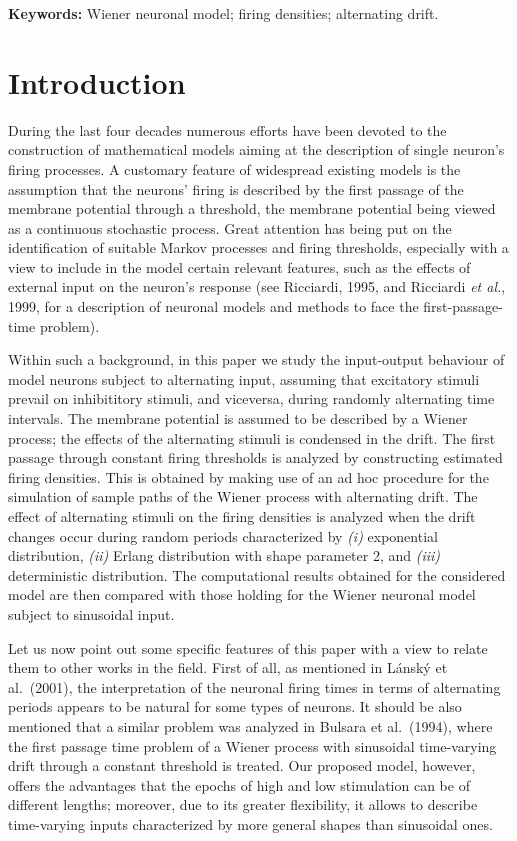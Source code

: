 \medskip\noindent
{\bf Keywords:} Wiener neuronal model; firing densities;
alternating drift.

\section{Introduction}\label{section:1}
During the last four decades numerous efforts have been devoted to the construction of mathematical
models aiming at the description of single neuron's firing processes. A customary feature of
widespread existing models is the assumption that the neurons' firing is described by the first
passage of the membrane potential through a threshold, the membrane potential being
viewed as a continuous stochastic process. Great attention has being put on the identification of
suitable Markov processes and firing thresholds, especially with a view to include in the model
certain relevant features, such as the effects of external input on the neuron's response
(see Ricciardi, 1995, and Ricciardi {\em et al.}, 1999, for a description of neuronal models
and methods to face the first-passage-time problem).
\par
Within such a background, in this paper we study the input-output behaviour of model neurons 
subject to alternating input, assuming that excitatory stimuli prevail on inhibititory 
stimuli, and viceversa, during randomly alternating time intervals. The membrane potential 
is assumed to be described by a Wiener process; the effects of the alternating stimuli is 
condensed in the drift. The first passage through constant firing thresholds is analyzed
by constructing estimated firing densities. This is obtained by making use of an ad hoc
procedure for the simulation of sample paths of the Wiener process with alternating drift.
The effect of alternating stimuli on the firing densities is
analyzed when the drift changes occur during random periods characterized by 
{\em (i)\/} exponential distribution, {\em (ii)\/} Erlang distribution with 
shape parameter 2, and {\em (iii)\/} deterministic distribution.
The computational results obtained for the considered model are then compared with
those holding for the Wiener neuronal model subject to sinusoidal input.
\par
Let us now point out some specific features of this paper with a view to relate them 
to other works in the field. First of all, as mentioned in L\'ansk\'y et al.\ (2001), 
the interpretation of the neuronal firing times in terms of alternating periods 
appears to be natural for some types of neurons. It should be also mentioned that 
a similar problem 
was analyzed in Bulsara et al.\ (1994), where the first passage time problem of 
a Wiener process with sinusoidal time-varying drift through a constant threshold 
is treated. Our proposed model, however, offers the advantages that the epochs of 
high and low stimulation can be of different lengths; moreover, due to its greater 
flexibility, it allows to describe time-varying inputs characterized by more 
general shapes than sinusoidal ones. 
